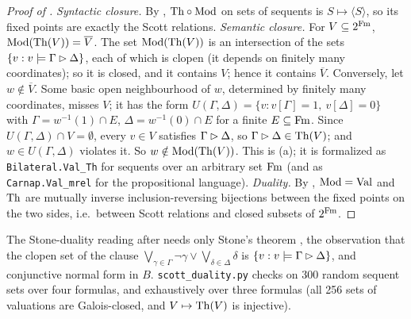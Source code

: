 \begin{proof}[Proof of ]
\emph{Syntactic closure.} By , $\mathrm{Th}\circ\mathrm{Mod}$ on sets of sequents is $S\mapsto\langle S\rangle$, so its fixed points are exactly the Scott relations.
\emph{Semantic closure.} For $V\subseteq2^{\mathrm{Fm}}$, $\mathrm{Mod}(\mathrm{Th}(V))=\overline V$. The set $\mathrm{Mod}(\mathrm{Th}(V))$ is an intersection of the sets $\{v:v\models\Gamma\rhd\Delta\}$, each of which is clopen (it depends on finitely many coordinates); so it is closed, and it contains $V$; hence it contains $\overline V$. Conversely, let $w\notin\overline V$. Some basic open neighbourhood of $w$, determined by finitely many coordinates, misses $V$; it has the form $U(\Gamma,\Delta)=\{v:v[\Gamma]=1,\ v[\Delta]=0\}$ with $\Gamma=w^{-1}(1)\cap E$, $\Delta=w^{-1}(0)\cap E$ for a finite $E\subseteq\mathrm{Fm}$. Since $U(\Gamma,\Delta)\cap V=\emptyset$, every $v\in V$ satisfies $\Gamma\rhd\Delta$, so $\Gamma\rhd\Delta\in\mathrm{Th}(V)$; and $w\in U(\Gamma,\Delta)$ violates it. So $w\notin\mathrm{Mod}(\mathrm{Th}(V))$. This is (a); it is formalized as \texttt{Bilateral.Val\_Th} for sequents over an arbitrary set $\mathrm{Fm}$ (and as \texttt{Carnap.Val\_mrel} for the propositional language).
\emph{Duality.} By , $\mathrm{Mod}=\mathrm{Val}$ and $\mathrm{Th}$ are mutually inverse inclusion-reversing bijections between the fixed points on the two sides, i.e.\ between Scott relations and closed subsets of $2^{\mathrm{Fm}}$.
\end{proof}

The Stone-duality reading after  needs only Stone's theorem \citep{stone1936theory}, the observation that the clopen set of the clause $\bigvee_{\gamma\in\Gamma}\neg\gamma\vee\bigvee_{\delta\in\Delta}\delta$ is $\{v:v\models\Gamma\rhd\Delta\}$, and conjunctive normal form in $B$. \texttt{scott\_duality.py} checks  on 300 random sequent sets over four formulas, and  exhaustively over three formulas (all 256 sets of valuations are Galois-closed, and $V\mapsto\mathrm{Th}(V)$ is injective).

